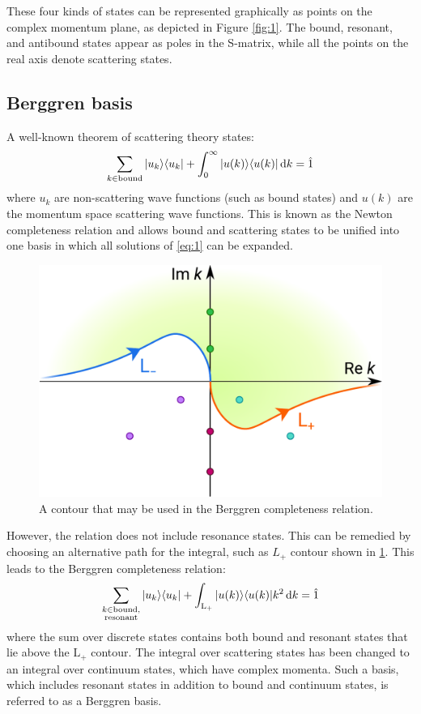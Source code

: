 \documentclass[amsmath, amssymb, aps, floatfix, nofootinbib, preprintnumbers,
  showpacs, superscriptaddress, twocolumn]{revtex4-1}
\begin{document}
These four kinds of states can be represented graphically as points on the
complex momentum plane, as depicted in Figure \ref{fig:1}.  The bound,
resonant, and antibound states appear as poles in the S-matrix, while all the
points on the real axis denote scattering states.

\subsection{Berggren basis}

A well-known theorem of scattering theory states:
\begin{align*}
\sum_{k \in \text{bound}} |u_k\rangle \langle u_k|
+ \int_0^\infty |u(k)\rangle \langle u(k)| \operatorname{d \!}\mathord{} k = \hat 1
\end{align*}
where $u_k$ are non-scattering wave functions (such as bound states) and
$u(k)$ are the momentum space scattering wave functions.  This is known as the
Newton completeness relation\cite{Newton1966} and allows bound and scattering
states to be unified into one basis in which all solutions of \eqref{eq:1} can
be expanded.

\begin{figure}
  \includegraphics[width=.4\textwidth]{proj-completeness.pdf}
  \caption{A contour that may be used in the Berggren completeness relation.}
  \label{fig:2}
\end{figure}

However, the relation does not include resonance states.  This can be remedied
by choosing an alternative path for the integral, such as $L_+$ contour shown
in \ref{fig:2}.  This leads to the Berggren completeness relation:\cite{Berggren1968}
\begin{align} \label{eq:2}
\sum_{\substack{k \in \text{bound},\\\text{resonant}}} |u_k\rangle \langle u_k|
+ \int_{\mathrm L_+} |u(k)\rangle \langle u(k)| k^2 \operatorname{d \!}\mathord{} k = \hat 1
\end{align}
where the sum over discrete states contains both bound and resonant states
that lie above the $\mathrm L_+$ contour.  The integral over scattering states
has been changed to an integral over continuum states, which have complex
momenta.  Such a basis, which includes resonant states in addition to bound
and continuum states, is referred to as a Berggren basis.
\end{document}
